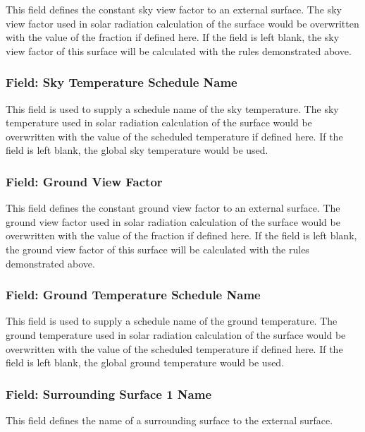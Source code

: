 This field defines the constant sky view factor to an external surface. The sky view factor used in solar radiation calculation of the surface would be overwritten with the value of the fraction if defined here. If the field is left blank, the sky view factor of this surface will be calculated with the rules demonstrated above.

\subsubsection{Field: Sky Temperature Schedule Name}\label{field-sky-temperature-schedule-name}

This field is used to supply a schedule name of the sky temperature. The sky temperature used in solar radiation calculation of the surface would be overwritten with the value of the scheduled temperature if defined here. If the field is left blank, the global sky temperature would be used.

\subsubsection{Field: Ground View Factor}\label{field-ground-view-factor}

This field defines the constant ground view factor to an external surface. The ground view factor used in solar radiation calculation of the surface would be overwritten with the value of the fraction if defined here. If the field is left blank, the ground view factor of this surface will be calculated with the rules demonstrated above.

\subsubsection{Field: Ground Temperature Schedule Name}\label{field-ground-temperature-schedule-name}

This field is used to supply a schedule name of the ground temperature. The ground temperature used in solar radiation calculation of the surface would be overwritten with the value of the scheduled temperature if defined here. If the field is left blank, the global ground temperature would be used.

\subsubsection{Field: Surrounding Surface 1 Name}\label{field-surrounding-surface-1-name}

This field defines the name of a surrounding surface to the external surface.

